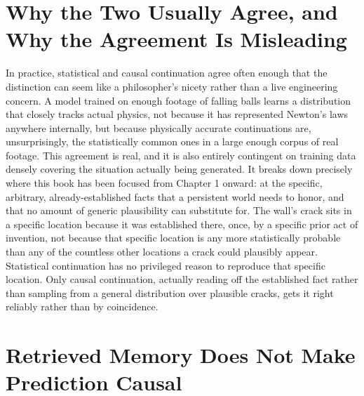 \section{Why the Two Usually Agree, and Why the Agreement Is Misleading}

In practice, statistical and causal continuation agree often enough that the distinction can seem like a philosopher's nicety rather than a live engineering concern. A model trained on enough footage of falling balls learns a distribution that closely tracks actual physics, not because it has represented Newton's laws anywhere internally, but because physically accurate continuations are, unsurprisingly, the statistically common ones in a large enough corpus of real footage. This agreement is real, and it is also entirely contingent on training data densely covering the situation actually being generated. It breaks down precisely where this book has been focused from Chapter 1 onward: at the specific, arbitrary, already-established facts that a persistent world needs to honor, and that no amount of generic plausibility can substitute for. The wall's crack sits in a specific location because it was established there, once, by a specific prior act of invention, not because that specific location is any more statistically probable than any of the countless other locations a crack could plausibly appear. Statistical continuation has no privileged reason to reproduce that specific location. Only causal continuation, actually reading off the established fact rather than sampling from a general distribution over plausible cracks, gets it right reliably rather than by coincidence.

\section{Retrieved Memory Does Not Make Prediction Causal}

